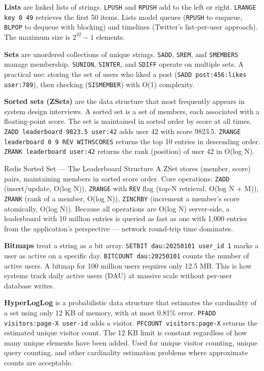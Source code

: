 \documentclass[11pt,a4paper]{article}
\begin{document}
\textbf{Lists} are linked lists of strings. \texttt{LPUSH} and \texttt{RPUSH} add to the left or right. \texttt{LRANGE key 0 49} retrieves the first 50 items. Lists model queues (\texttt{RPUSH} to enqueue, \texttt{BLPOP} to dequeue with blocking) and timelines (Twitter's list-per-user approach). The maximum size is $2^{32} - 1$ elements.

\textbf{Sets} are unordered collections of unique strings. \texttt{SADD}, \texttt{SREM}, and \texttt{SMEMBERS} manage membership. \texttt{SUNION}, \texttt{SINTER}, and \texttt{SDIFF} operate on multiple sets. A practical use: storing the set of users who liked a post (\texttt{SADD post:456:likes user:789}), then checking (\texttt{SISMEMBER}) with O(1) complexity.

\textbf{Sorted sets (ZSets)} are the data structure that most frequently appears in system design interviews. A sorted set is a set of members, each associated with a floating-point score. The set is maintained in sorted order by score at all times. \texttt{ZADD leaderboard 9823.5 user:42} adds user 42 with score 9823.5. \texttt{ZRANGE leaderboard 0 9 REV WITHSCORES} returns the top 10 entries in descending order. \texttt{ZRANK leaderboard user:42} returns the rank (position) of user 42 in O(log N).

\begin{termbox}{Redis Sorted Set --- The Leaderboard Structure}
A ZSet stores (member, score) pairs, maintaining members in sorted score order. Core operations: \texttt{ZADD} (insert/update, O(log N)), \texttt{ZRANGE} with \texttt{REV} flag (top-N retrieval, O(log N + M)), \texttt{ZRANK} (rank of a member, O(log N)), \texttt{ZINCRBY} (increment a member's score atomically, O(log N)). Because all operations are O(log N) server-side, a leaderboard with 10 million entries is queried as fast as one with 1,000 entries from the application's perspective --- network round-trip time dominates.
\end{termbox}

\textbf{Bitmaps} treat a string as a bit array. \texttt{SETBIT dau:20250101 user\_id 1} marks a user as active on a specific day. \texttt{BITCOUNT dau:20250101} counts the number of active users. A bitmap for 100 million users requires only 12.5 MB. This is how systems track daily active users (DAU) at massive scale without per-user database writes.

\textbf{HyperLogLog} is a probabilistic data structure that estimates the cardinality of a set using only 12 KB of memory, with at most 0.81\% error. \texttt{PFADD visitors:page-X user-id} adds a visitor. \texttt{PFCOUNT visitors:page-X} returns the estimated unique visitor count. The 12 KB limit is constant regardless of how many unique elements have been added. Used for unique visitor counting, unique query counting, and other cardinality estimation problems where approximate counts are acceptable.
\end{document}
